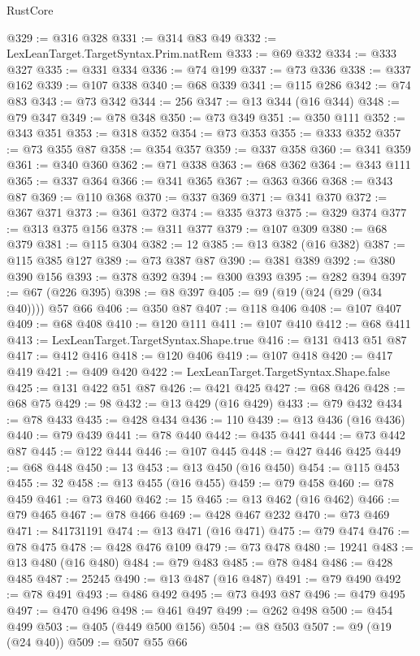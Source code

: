 \begin{lexlean}{RustCore}
\begin{coremodule}
@329 := @316 @328
@331 := @314 @83 @49
@332 := LexLeanTarget.TargetSyntax.Prim.natRem
@333 := @69 @332
@334 := @333 @327
@335 := @331 @334
@336 := @74 @199
@337 := @73 @336
@338 := @337 @162
@339 := @107 @338
@340 := @68 @339
@341 := @115 @286
@342 := @74 @83
@343 := @73 @342
@344 := 256
@347 := @13 @344 (@16 @344)
@348 := @79 @347
@349 := @78 @348
@350 := @73 @349
@351 := @350 @111
@352 := @343 @351
@353 := @318 @352
@354 := @73 @353
@355 := @333 @352
@357 := @73 @355 @87
@358 := @354 @357
@359 := @337 @358
@360 := @341 @359
@361 := @340 @360
@362 := @71 @338
@363 := @68 @362
@364 := @343 @111
@365 := @337 @364
@366 := @341 @365
@367 := @363 @366
@368 := @343 @87
@369 := @110 @368
@370 := @337 @369
@371 := @341 @370
@372 := @367 @371
@373 := @361 @372
@374 := @335 @373
@375 := @329 @374
@377 := @313 @375 @156
@378 := @311 @377
@379 := @107 @309
@380 := @68 @379
@381 := @115 @304
@382 := 12
@385 := @13 @382 (@16 @382)
@387 := @115 @385 @127
@389 := @73 @387 @87
@390 := @381 @389
@392 := @380 @390 @156
@393 := @378 @392
@394 := @300 @393
@395 := @282 @394
@397 := @67 (@226 @395)
@398 := @8 @397
@405 := @9 (@19 (@24 (@29 (@34 @40)))) @57 @66
@406 := @350 @87
@407 := @118 @406
@408 := @107 @407
@409 := @68 @408
@410 := @120 @111
@411 := @107 @410
@412 := @68 @411
@413 := LexLeanTarget.TargetSyntax.Shape.true
@416 := @131 @413 @51 @87
@417 := @412 @416
@418 := @120 @406
@419 := @107 @418
@420 := @417 @419
@421 := @409 @420
@422 := LexLeanTarget.TargetSyntax.Shape.false
@425 := @131 @422 @51 @87
@426 := @421 @425
@427 := @68 @426
@428 := @68 @75
@429 := 98
@432 := @13 @429 (@16 @429)
@433 := @79 @432
@434 := @78 @433
@435 := @428 @434
@436 := 110
@439 := @13 @436 (@16 @436)
@440 := @79 @439
@441 := @78 @440
@442 := @435 @441
@444 := @73 @442 @87
@445 := @122 @444
@446 := @107 @445
@448 := @427 @446 @425
@449 := @68 @448
@450 := 13
@453 := @13 @450 (@16 @450)
@454 := @115 @453
@455 := 32
@458 := @13 @455 (@16 @455)
@459 := @79 @458
@460 := @78 @459
@461 := @73 @460
@462 := 15
@465 := @13 @462 (@16 @462)
@466 := @79 @465
@467 := @78 @466
@469 := @428 @467 @232
@470 := @73 @469
@471 := 841731191
@474 := @13 @471 (@16 @471)
@475 := @79 @474
@476 := @78 @475
@478 := @428 @476 @109
@479 := @73 @478
@480 := 19241
@483 := @13 @480 (@16 @480)
@484 := @79 @483
@485 := @78 @484
@486 := @428 @485
@487 := 25245
@490 := @13 @487 (@16 @487)
@491 := @79 @490
@492 := @78 @491
@493 := @486 @492
@495 := @73 @493 @87
@496 := @479 @495
@497 := @470 @496
@498 := @461 @497
@499 := @262 @498
@500 := @454 @499
@503 := @405 (@449 @500 @156)
@504 := @8 @503
@507 := @9 (@19 (@24 @40))
@509 := @507 @55 @66

\end{coremodule}
\end{lexlean}

